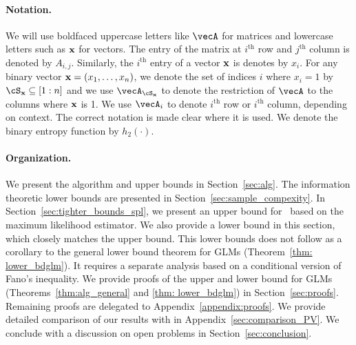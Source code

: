 \paragraph{Notation.}We will use boldfaced uppercase letters like $\vecA$ for matrices and lowercase letters such as $\mathbf{x}$ for vectors. The entry of the matrix at $i^{\text{th}}$ row and $j^{\text{th}}$ column is denoted by $A_{i,j}$. Similarly, the $i^{\text{th}}$ entry of a vector $\mathbf{x}$ is denotes by $x_i$.
For any binary vector $\mathbf{x} = \left(x_1, \ldots, x_n\right)$, we denote the set of indices $i$ where $x_i = 1$ by $\cS_{\bx}\subseteq [1:n]$ and we use $\vecA_{\cS_{\bx}}$ to denote the restriction of $\vecA$ to the columns where $\mathbf{x}$ is 1. We use $\vecA_i$ to  denote $i^{\text{th}}$ row or $i^{\text{th}}$ column, depending on context. The correct notation is made clear where it is used. We denote the binary entropy function by $h_2(\cdot)$.



\paragraph{Organization.} We present the algorithm  and upper bounds in Section~\ref{sec:alg}. The information theoretic lower bounds are presented in Section~\ref{sec:sample_compexity}.  In Section~\ref{sec:tighter_bounds_spl}, we present an upper bound for \spl\ based on the maximum likelihood estimator. We also provide a lower bound in this section, which closely matches the upper bound. This lower bounds  does not follow as a corollary to the general lower bound theorem for GLMs (Theorem~\ref{thm: lower_bdglm}). It requires a separate analysis based on a conditional version of Fano's inequality. We provide proofs of the upper and lower bound for GLMs (Theorems~\ref{thm:alg_general} and \ref{thm: lower_bdglm}) in Section~\ref{sec:proofs}. Remaining proofs are delegated to Appendix~\ref{appendix:proofs}. We provide detailed comparison of our results with \cite{vershyninPlan} in Appendix~\ref{sec:comparison_PV}. We conclude with a discussion on open problems in Section~\ref{sec:conclusion}.
